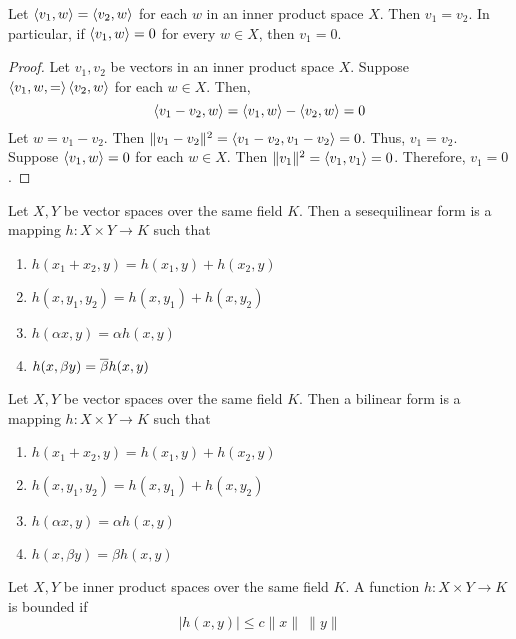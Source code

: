 \begin{lemma}[equality]
	Let $\left\langle v_1,w \right\rangle = \left\langle v_2,w \right\rangle$ for each $w$ in an inner product space $X$.
	Then $v_1 = v_2$.
	In particular, if $\left\langle v_1,w \right\rangle = 0$ for every $w \in X$, then $v_1 = 0$.
\end{lemma}
\begin{proof}
	Let $v_1,v_2$ be vectors in an inner product space $X$.
	Suppose $\left\langle v_1,w,= \right\rangle \left\langle v_2,w \right\rangle$ for each $w \in X$.
	Then,
	\[ \left\langle v_1-v_2,w \right\rangle = \left\langle v_1,w \right\rangle - \left\langle v_2,w \right\rangle = 0 \]
	Let $w= v_1-v_2$.
	Then $\|v_1-v_2\|^2 = \left\langle v_1-v_2,v_1-v_2 \right\rangle = 0$.
	Thus, $v_1 = v_2$.\\

	Suppose $\left\langle v_1,w \right\rangle = 0$ for each $w \in X$.
	Then $\|v_1\|^2 = \left\langle v_1,v_1 \right\rangle = 0$.
	Therefore, $v_1 = 0$.
\end{proof}

\begin{definition}
	Let $X,Y$ be vector spaces over the same field $K$.
	Then a sesequilinear form is a mapping $h : X \times Y \to K$ such that
	\begin{enumerate}
		\item $h(x_1+x_2,y) = h(x_1,y)+h(x_2,y)$
		\item $h(x,y_1,y_2) = h(x,y_1) + h(x,y_2)$
		\item $h(\alpha x,y) = \alpha h(x,y)$
		\item $h(x,\beta y) = \overline{\beta} h(x,y)$
	\end{enumerate}
\end{definition}

\begin{definition}
	Let $X,Y$ be vector spaces over the same field $K$.
	Then a bilinear form is a mapping $h : X \times Y \to K$ such that
	\begin{enumerate}
		\item $h(x_1+x_2,y) = h(x_1,y)+h(x_2,y)$
		\item $h(x,y_1,y_2) = h(x,y_1) + h(x,y_2)$
		\item $h(\alpha x,y) = \alpha h(x,y)$
		\item $h(x,\beta y) = \beta h(x,y)$
	\end{enumerate}
\end{definition}

\begin{definition}
	Let $X,Y$ be inner product spaces over the same field $K$.
	A function $h : X \times Y \to K$ is bounded if
	\[ |h(x,y)| \le c\|x\| \ \|y\| \]
\end{definition}

